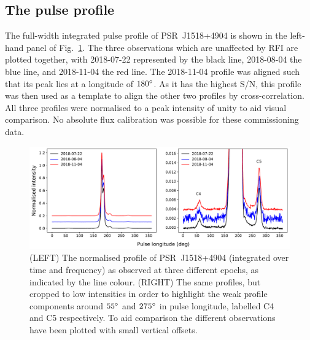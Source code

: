 \subsection{The pulse profile}
\label{sec: J1518 - analysis - new profile component}

The full-width integrated pulse profile of PSR~J1518+4904 is shown in the left-hand panel of Fig.~\ref{fig: J1518 - integrated profile}. The three observations which are unaffected by RFI are plotted together, with 2018-07-22 represented by the black line, 2018-08-04 the blue line, and 2018-11-04 the red line. The 2018-11-04 profile was aligned such that its peak lies at a longitude of $180^\circ$. As it has the highest S/N, this profile was then used as a template to align the other two profiles by cross-correlation. All three profiles were normalised to a peak intensity of unity to aid visual comparison. No absolute flux calibration was possible for these commissioning data.
\begin{figure}
    \begin{center}
        \includegraphics[width=1.0\textwidth]{Figures/J1518/profile_components}
        \caption[New profile components in PSR~J1518+4904]{(LEFT) The normalised profile of PSR~J1518+4904 (integrated over time and frequency) as observed at three different epochs, as indicated by the line colour. (RIGHT) The same profiles, but cropped to low intensities in order to highlight the weak profile components around $55^\circ$ and $275^\circ$ in pulse longitude, labelled C4 and C5 respectively. To aid comparison the different observations have been plotted with small vertical offsets.}
        \label{fig: J1518 - integrated profile}
    \end{center}
\end{figure}

